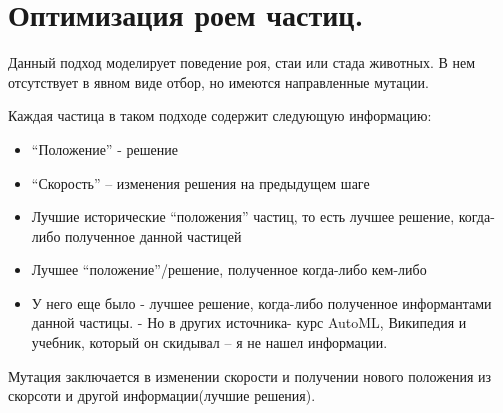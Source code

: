 \section{Оптимизация роем частиц.}

Данный подход моделирует поведение роя, стаи или стада животных. В нем отсутствует в явном виде отбор, но имеются направленные мутации.

Каждая частица в таком подходе содержит следующую информацию:

\begin{itemize}
      \item “Положение” - решение
      \item “Скорость” – изменения решения на предыдущем шаге
      \item Лучшие исторические “положения” частиц, то есть лучшее решение, когда-либо полученное данной частицей
      \item Лучшее “положение”/решение, полученное когда-либо кем-либо
      \item У него еще было - лучшее решение, когда-либо полученное информантами данной частицы. -  Но в других источника- курс AutoML, Википедия и учебник, который он скидывал – я не нашел информации. 
   \end{itemize}

Мутация заключается в изменении скорости и получении нового положения из скорсоти и другой информации(лучшие решения).
